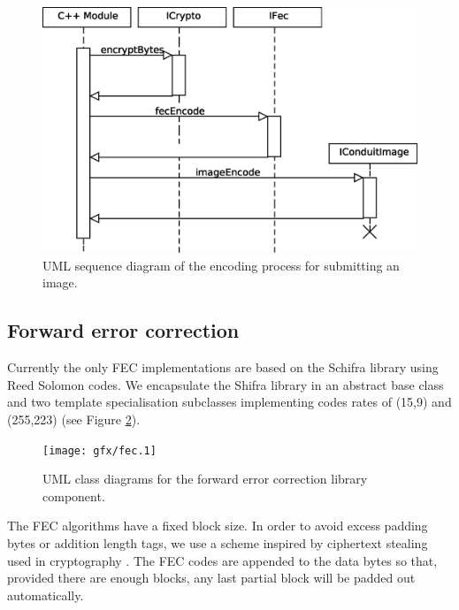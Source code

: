     \begin{figure}[tb]
        \begin{center}
                \includegraphics[width=12cm]{gfx/img-seq.eps}
            \caption{UML sequence diagram of the encoding process for submitting an image.}
            \label{eps:img}
        \end{center}
    \end{figure}


\FloatBarrier
\subsection{Forward error correction}

Currently the only FEC implementations are based on the Schifra library using Reed Solomon codes. We encapsulate the Shifra library in an abstract base class and two template specialisation subclasses implementing codes rates of (15,9) and (255,223) (see Figure \ref{uml:fec}).


    \begin{figure}[tb]
        \begin{center}
                \texttt{[image: gfx/fec.1]}
            \caption{UML class diagrams for the forward error correction library component.}
            \label{uml:fec}
        \end{center}
    \end{figure}

The FEC algorithms have a fixed block size. In order to avoid excess padding bytes or addition length tags, we use a scheme inspired by ciphertext stealing used in cryptography \cite{stealing}. The FEC codes are appended to the data bytes so that, provided there are enough blocks, any last partial block will be padded out automatically.


